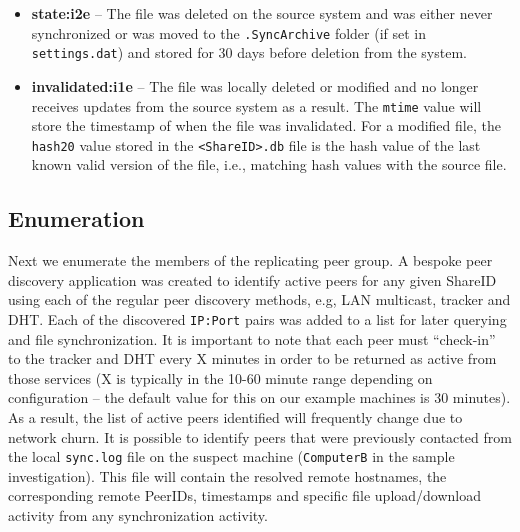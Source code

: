 \documentclass{jdfsl}
\begin{document}
\begin{itemize}[label={}]
  \item \textbf{state:i2e} -- The file was deleted on the source system and was either never synchronized or was moved to the \texttt{.SyncArchive} folder (if set in \texttt{settings.dat}) and stored for 30 days before deletion from the system.
  \item \textbf{invalidated:i1e} -- The file was locally deleted or modified and no longer receives updates from the source system as a result. The \texttt{mtime} value will store the timestamp of when the file was invalidated. For a modified file, the \texttt{hash20} value stored in the \texttt{<ShareID>.db} file is the hash value of the last known valid version of the file, i.e., matching hash values with the source file.\\
\end{itemize}

\subsection{Enumeration}
\label{POC:Enum}

Next we enumerate the members of the replicating peer group. A bespoke peer discovery application was created to identify active peers for any given ShareID using each of the regular peer discovery methods, e.g, LAN multicast, tracker and DHT. Each of the discovered \texttt{IP:Port} pairs was added to a list for later querying and file synchronization. It is important to note that each peer must ``check-in'' to the tracker and DHT every X minutes in order to be returned as active from those services (X is typically in the 10-60 minute range depending on configuration -- the default value for this on our example machines is 30 minutes). As a result, the list of active peers identified will frequently change due to network churn. It is possible to identify peers that were previously contacted from the local \texttt{sync.log} file on the suspect machine (\texttt{ComputerB} in the sample investigation). This file will contain the resolved remote hostnames, the corresponding remote PeerIDs, timestamps and specific file upload/download activity from any synchronization activity.\\
\end{document}
